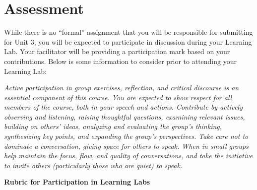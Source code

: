 \documentclass[
]{book}
\begin{document}
\hypertarget{assessment}{%
\section*{Assessment}\label{assessment}}

\begin{assessment}
While there is no ``formal'' assignment that you will be responsible for submitting for Unit 3, you will be expected to participate in discussion during your Learning Lab. Your facilitator will be providing a participation mark based on your contributions. Below is some information to consider prior to attending your Learning Lab:

\emph{Active participation in group exercises, reflection, and critical discourse is an essential component of this course. You are expected to show respect for all members of the course, both in your speech and actions. Contribute by actively observing and listening, raising thoughtful questions, examining relevant issues, building on others' ideas, analyzing and evaluating the group's thinking, synthesizing key points, and expanding the group's perspectives. Take care not to dominate a conversation, giving space for others to speak. When in small groups help maintain the focus, flow, and quality of conversations, and take the initiative to invite others (particularly those who are quiet) to speak.}

\textbf{Rubric for Participation in Learning Labs}


\end{assessment}
\end{document}
